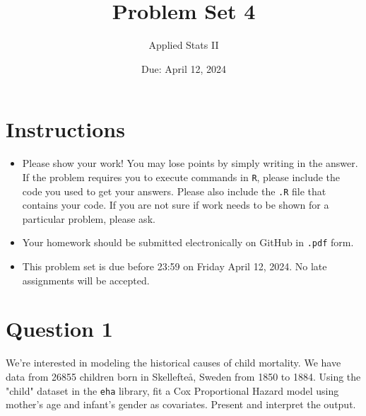 \documentclass[12pt,letterpaper]{article}
\title{Problem Set 4}
\date{Due: April 12, 2024}
\author{Applied Stats II}
\begin{document}
	\maketitle
	\section*{Instructions}
	\begin{itemize}
	\item Please show your work! You may lose points by simply writing in the answer. If the problem requires you to execute commands in \texttt{R}, please include the code you used to get your answers. Please also include the \texttt{.R} file that contains your code. If you are not sure if work needs to be shown for a particular problem, please ask.
	\item Your homework should be submitted electronically on GitHub in \texttt{.pdf} form.
	\item This problem set is due before 23:59 on Friday April 12, 2024. No late assignments will be accepted.

	\end{itemize}

	\vspace{.25cm}
\section*{Question 1}
\vspace{.25cm}
\noindent We're interested in modeling the historical causes of child mortality. We have data from 26855 children born in Skellefteå, Sweden from 1850 to 1884. Using the "child" dataset in the \texttt{eha} library, fit a Cox Proportional Hazard model using mother's age and infant's gender as covariates. Present and interpret the output.
\end{document}
